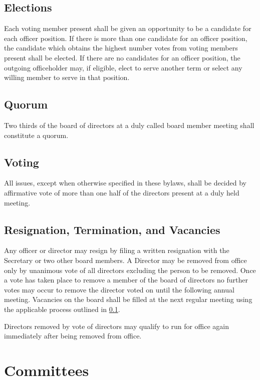 \documentclass[10pt,letterpaper,titlepage]{article}
\begin{document}
\subsection{Elections}
\label{elections}

Each voting member present shall be given an opportunity to be a candidate for each
officer position.
If there is more than one candidate for an officer position, the candidate
which obtains the highest number votes from voting members present shall be
elected.
If there are no candidates for an officer position, the outgoing officeholder
may, if eligible, elect to serve another term or select any willing member to
serve in that position.

\subsection{Quorum}

Two thirds of the board of directors at a duly called board member meeting shall
constitute a quorum.

\subsection{Voting}

All issues, except when otherwise specified in these bylaws, shall be decided
by affirmative vote of more than one half of the directors present at a duly held
meeting.

\subsection{Resignation, Termination, and Vacancies}

Any officer or director may resign by filing a written resignation with the
Secretary or two other board members.
A Director may be removed from office only by unanimous vote of all directors
excluding the person to be removed.
Once a vote has taken place to remove a member of the board of directors no
further votes may occur to remove the director voted on until the following
annual meeting.
Vacancies on the board shall be filled at the next regular meeting using the
applicable process outlined in \ref{elections}.

Directors removed by vote of directors may qualify to run for office again
immediately after being removed from office.

\section{Committees}
\end{document}
